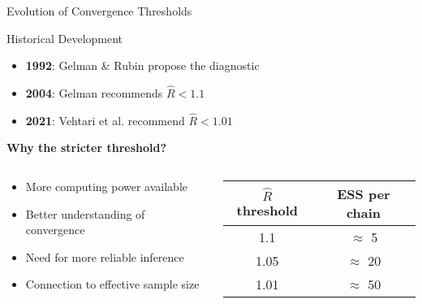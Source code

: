\begin{frame}{Evolution of Convergence Thresholds}
	\begin{block}{Historical Development}
		\begin{itemize}
			\item \textbf{1992}: Gelman \& Rubin propose the diagnostic
			\item \textbf{2004}: Gelman recommends $\hat{R} < 1.1$
			\item \textbf{2021}: Vehtari et al. recommend $\hat{R} < 1.01$
		\end{itemize}
	\end{block}

	\vspace{0.5cm}
	\textbf{Why the stricter threshold?}

	\begin{columns}
		\begin{column}{0.5\textwidth}
			\begin{itemize}
				\item More computing power available
				\item Better understanding of convergence
				\item Need for more reliable inference
				\item Connection to effective sample size
			\end{itemize}
		\end{column}
		\begin{column}{0.5\textwidth}
			\begin{center}
				\begin{tabular}{|c|c|}
					\hline
					$\hat{R}$ threshold & ESS per chain \\
					\hline
					1.1                 & $\approx$ 5   \\
					1.05                & $\approx$ 20  \\
					1.01                & $\approx$ 50  \\
					\hline
				\end{tabular}
			\end{center}
		\end{column}
	\end{columns}
\end{frame}

